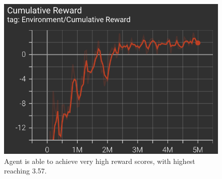 \begin{figure}[t]
    \centering
    \includegraphics[width=0.99\columnwidth, height=0.7\columnwidth]{Chapter3/Final/Final_Cum.png}\par
    \caption{Agent is able to achieve very high reward scores, with highest reaching 3.57.}
    \label{fig:final_cumreward}
\end{figure}
